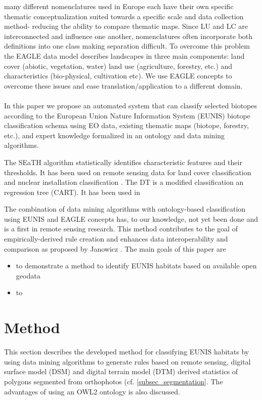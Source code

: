 \documentclass[authoryear, review,12pt,number]{elsarticle}
\begin{document}
many different nomenclatures used in Europe each have their own specific 
thematic conceptualization suited towards a specific scale and data collection 
method- reducing the ability to compare thematic maps. Since LU and LC are 
interconnected and influence one another, nomenclatures often incorporate both 
definitions into one class making separation difficult. To overcome this problem 
the EAGLE data model describes landscapes in three main components: land cover 
(abiotic, vegetation, water) land use (agriculture, forestry, etc.) and 
characteristics (bio-physical, cultivation etc). We use EAGLE concepts to 
overcome these issues and ease translation/application to a different domain.\\
\\
In this paper we propose an automated system that can
classify selected biotopes according to the European Union Nature Information
System (EUNIS) biotope classification schema using EO data, existing
thematic maps (biotope, forestry, etc.), and expert knowledge formalized in an
ontology and data mining algorithms.

The SEaTH algorithm statistically identifies characteristic features and their 
thresholds. It has been used on remote sensing data for land cover 
classification \citep{Gao2011, Mhangara2013} and nuclear installation 
classification \citep{Nussbaum2006}. 
The DT is a modified classification an regression tree 
(CART)\citep{scikit-learn}. It has been used in

The combination of data mining algorithms 
with ontology-based classification using EUNIS and EAGLE concepts has, to our 
knowledge, not yet been done and is a first in remote sensing research. This 
method
contributes to the goal of empirically-derived rule creation and enhances
data interoperability and comparison as proposed by 
Janowicz \citep{Janowicz2012}.
The main goals of this paper are 
\begin{itemize}
 \item to demonstrate a method to identify EUNIS habitats based on available 
open geodata
 \item to
\end{itemize}

\section{Method}
This section describes the developed method for classifying EUNIS habitats by
using data mining algorithms to generate rules based on remote sensing, digital
surface model (DSM) and digital terrain model (DTM) derived statistics of
polygons segmented from orthophotos (cf. \ref{subsec_segmentation}. The 
advantages of using an OWL2 ontology is also discussed.
\end{document}
